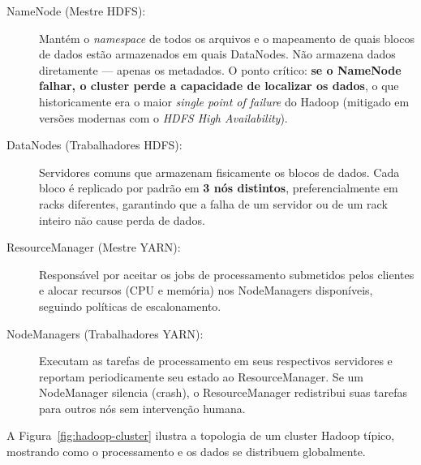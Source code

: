 \documentclass[12pt,a4paper]{report}
\begin{document}
\begin{description}
    \item[NameNode (Mestre HDFS):] Mantém o \emph{namespace} de todos os
    arquivos e o mapeamento de quais blocos de dados estão armazenados em quais
    DataNodes. Não armazena dados diretamente --- apenas os metadados. O ponto
    crítico: \textbf{se o NameNode falhar, o cluster perde a capacidade de
    localizar os dados}, o que historicamente era o maior \textit{single point
    of failure} do Hadoop (mitigado em versões modernas com o \emph{HDFS High
    Availability}).
    \item[DataNodes (Trabalhadores HDFS):] Servidores comuns que armazenam
    fisicamente os blocos de dados. Cada bloco é replicado por padrão em
    \textbf{3 nós distintos}, preferencialmente em racks diferentes, garantindo
    que a falha de um servidor ou de um rack inteiro não cause perda de dados.
    \item[ResourceManager (Mestre YARN):] Responsável por aceitar os jobs de
    processamento submetidos pelos clientes e alocar recursos (CPU e memória)
    nos NodeManagers disponíveis, seguindo políticas de escalonamento.
    \item[NodeManagers (Trabalhadores YARN):] Executam as tarefas de
    processamento em seus respectivos servidores e reportam periodicamente seu
    estado ao ResourceManager. Se um NodeManager silencia (crash), o
    ResourceManager redistribui suas tarefas para outros nós sem intervenção
    humana.
\end{description}

A Figura~\ref{fig:hadoop-cluster} ilustra a topologia de um cluster Hadoop
típico, mostrando como o processamento e os dados se distribuem globalmente.
\end{document}
